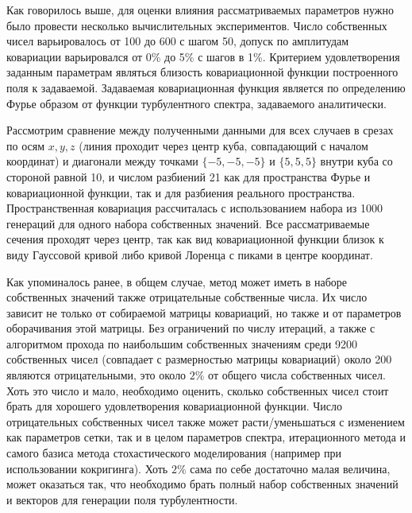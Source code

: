 Как говорилось выше, для оценки влияния рассматриваемых параметров нужно было провести несколько вычислительных экспериментов. Число собственных чисел варьировалось от 100 до 600 с шагом 50, допуск по амплитудам ковариации варьировался от 0\% до 5\% с шагов в 1\%. Критерием удовлетворения заданным параметрам являться близость ковариационной функции построенного поля к задаваемой. Задаваемая ковариационная функция является по определению Фурье образом от функции турбулентного спектра, задаваемого аналитически.

Рассмотрим сравнение между полученными данными для всех случаев в срезах по осям $x, y, z$ (линия проходит через центр куба, совпадающий с началом координат) и диагонали между точками $\{-5, -5, -5\}$ и $\{5, 5, 5\}$ внутри куба со стороной равной 10, и числом разбиений 21 как для пространства Фурье и ковариационной функции, так и для разбиения реального пространства. Пространственная ковариация рассчиталась с использованием набора из 1000 генераций для одного набора собственных значений. Все рассматриваемые сечения проходят через центр, так как вид ковариационной функции близок к виду Гауссовой кривой либо кривой Лоренца с пиками в центре координат.

Как упоминалось ранее, в общем случае, метод может иметь в наборе собственных значений также отрицательные собственные числа. Их число зависит не только от собираемой матрицы ковариаций, но также и от параметров оборачивания этой матрицы. Без ограничений по числу итераций, а также с алгоритмом прохода по наибольшим собственных значениям среди 9200 собственных чисел (совпадает с размерностью матрицы ковариаций) около 200 являются отрицательными, это около $2\%$ от общего числа собственных чисел. Хоть это число и мало, необходимо оценить, сколько собственных чисел стоит брать для хорошего удовлетворения ковариационной функции. Число отрицательных собственных чисел также может расти/уменьшаться с изменением как параметров сетки, так и в целом параметров спектра, итерационного метода и самого базиса метода стохастического моделирования (например при использовании кокригинга). Хоть $2\%$ сама по себе достаточно малая величина, может оказаться так, что необходимо брать полный набор собственных значений и векторов для генерации поля турбулентности.

